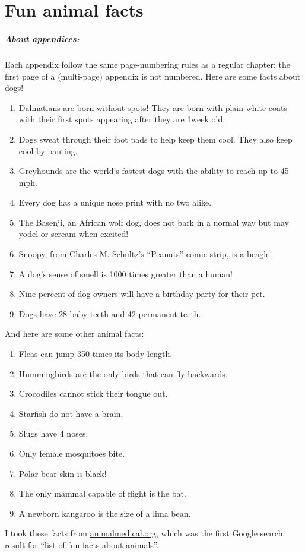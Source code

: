 
\chapter{Fun animal facts} %

\paragraph{About appendices:}
	Each appendix follow the same page-numbering rules as a regular chapter; the
	first page of a (multi-page) appendix is not numbered.  Here are some facts about dogs!

\begin{enumerate}
	\item Dalmatians are born without spots!  They are born with plain white coats with their first spots appearing after they are 1week old.
	\item Dogs sweat through their foot pads to help keep them cool.  They also keep cool by panting.
	\item Greyhounds are the world's fastest dogs with the ability to reach up to 45 mph.
	\item Every dog has a unique nose print with no two alike.
	\item The Basenji, an African wolf dog, does not bark in a normal way but may yodel or scream when excited!
	\item Snoopy, from Charles M. Schultz's “Peanuts” comic strip, is a beagle.
	\item A dog's sense of smell is 1000 times greater than a human!
	\item Nine percent of dog owners will have a birthday party for their pet.
	\item Dogs have 28 baby teeth and 42 permanent teeth.
\end{enumerate}

And here are some other animal facts:

\begin{enumerate}
 \item Fleas can jump 350 times its body length.
 \item Hummingbirds are the only birds that can fly backwards.
 \item Crocodiles cannot stick their tongue out.
 \item Starfish do not have a brain.
 \item Slugs have 4 noses.
 \item Only female mosquitoes bite.
 \item Polar bear skin is black!
 \item The only mammal capable of flight is the bat.
 \item A newborn kangaroo is the size of a lima bean.
\end{enumerate}

I took these facts from
\href{https://animalmedical.org/fun-facts}{animalmedical.org}, which was the
first Google search result for ``list of fun facts about animals''.
